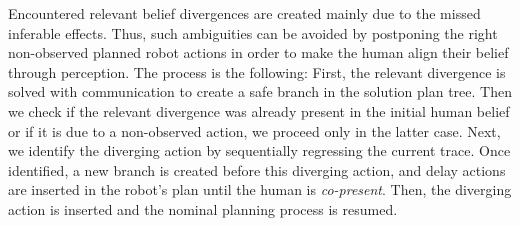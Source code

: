 \documentclass[letterpaper]{article} %
\begin{document}

Encountered relevant belief divergences are created mainly due to the missed inferable effects. 
Thus, such ambiguities can be avoided by postponing the right non-observed planned robot actions in order to make the human align their belief through perception. 
The process is the following:
First, the relevant divergence is solved with communication to create a safe branch in the solution plan tree. 
Then we check if the relevant divergence was already present in the initial human belief or if it is due to a non-observed action, we proceed only in the latter case. 
Next, we identify the diverging action by sequentially regressing the current trace.
Once identified, a new branch is created before this diverging action, and {\sc delay} actions are inserted in the robot's plan until the human is \textit{co-present}. 
Then, the diverging action is inserted and the nominal planning process is resumed.
\end{document}
